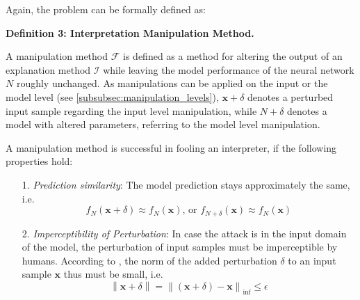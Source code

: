 \documentclass[sigconf]{acmart}
\newcommand{\norm}[1]{\left\lVert#1\right\rVert}
\DeclareMathOperator*{\argmax}{arg\,max}
\begin{document}
Again, the problem can be formally defined as:

\par\smallskip
\textbf{Definition 3: Interpretation Manipulation Method.}

\setlength{\leftskip}{0.39cm}
\noindent A manipulation method $\mathcal{F}$ is defined as a method for altering the output of an explanation method $\mathcal{I}$ while leaving the model performance of the neural network $N$ roughly unchanged. 
As manipulations can be applied on the input or the model level (see \autoref{subsubsec:manipulation_levels}), $\mathbf{x}+\delta$ denotes a perturbed input sample regarding the input level manipulation, while $N+\delta$ denotes a model with altered parameters, referring to the model level manipulation.

A manipulation method is successful in fooling an interpreter, if the following properties hold: 
\begin{enumerate}
    \item[1.] \textit{Prediction similarity}: The model prediction stays approximately the same, i.e. $$f_N(\mathbf{x}+\delta) \approx f_N(\mathbf{x}) \text{, or } f_{N+\delta}(\mathbf{x}) \approx f_N(\mathbf{x})$$
    \item[2.] \textit{Imperceptibility of Perturbation}: In case the attack is in the input domain of the model, the perturbation of input samples must be imperceptible by humans. According to \cite{dombrowski2019explanations}, the norm of the added perturbation $\delta$ to an input sample $\mathbf{x}$ thus must be small, i.e. $$\norm{\mathbf{x}+\delta} = \norm{(\mathbf{x}+\delta)-\mathbf{x}}_{\inf} \leq \epsilon$$ %
\end{enumerate}
\setlength{\leftskip}{0cm}
\end{document}
